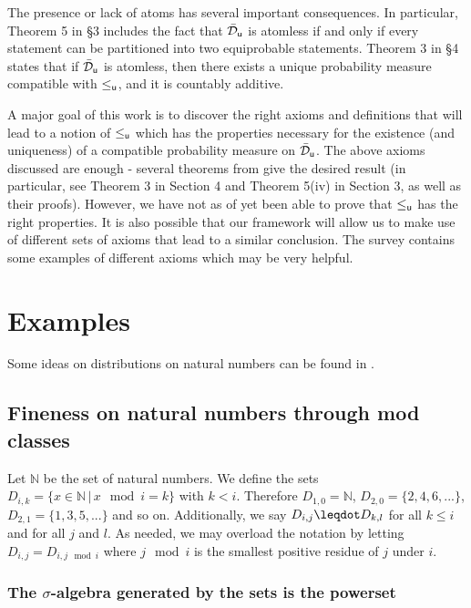 \documentclass[10pt, onecolumn, longbibliography, nofootinbib]{revtex4-2}
\begin{document}
The presence or lack of atoms has several important consequences. In particular, Theorem 5 in \cite{villegas} \S3 includes the fact that $\tdomain_{\stmt[u]}$ is atomless if and only if every statement can be partitioned into two equiprobable statements. Theorem 3 in \S4 states that if $\tdomain_{\stmt[u]}$ is atomless, then there exists a unique probability measure compatible with $\leq_{\stmt[u]}$, and it is countably additive. 

A major goal of this work is to discover the right axioms and definitions that will lead to a notion of $\lequ$ which has the properties necessary for the existence (and uniqueness) of a compatible probability measure on $\tdomain_{\stmt[u]}$. The above axioms discussed are enough - several theorems from \cite{villegas} give the desired result (in particular, see Theorem 3 in Section 4 and Theorem 5(iv) in Section 3, as well as their proofs). However, we have not as of yet been able to prove that $\lequ$ has the right properties. It is also possible that our framework will allow us to make use of different sets of axioms that lead to a similar conclusion. The survey \cite{fishburnsurvey} contains some examples of different axioms which may be very helpful. 

\section{Examples}

Some ideas on distributions on natural numbers can be found in \cite{Schirokauer2007}.

\subsection{Fineness on natural numbers through mod classes}\label{example_naturals}

Let $\mathbb{N}$ be the set of natural numbers. We define the sets $D_{i,k} = \{ x \in \mathbb{N} \, | \, x \mod i = k \}$ with $k < i$. Therefore $D_{1,0} = \mathbb{N}$, $D_{2,0} = \{ 2, 4, 6, ... \}$, $D_{2,1} = \{ 1, 3, 5, ... \}$ and so on. Additionally, we say $D_{i,j} \finer D_{k,l}$ for all $k \leq i$ and for all $j$ and $l$. As needed, we may overload the notation by letting $D_{i,j} =  D_{i, j \mod i}$ where $j\mod i$ is the smallest positive residue of $j$ under $i$.

\subsubsection{The $\sigma$-algebra generated by the sets is the powerset}
\end{document}
